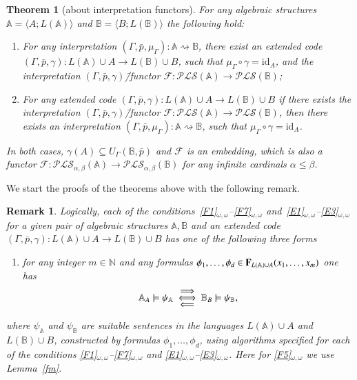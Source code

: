 \documentclass[12pt]{article}
\newtheorem{theorem}{Theorem}
\newtheorem{remark}{Remark}
\theoremstyle{definition}
\def\N{{\mathbb{N}}}
\def\MA{{\mathbb{A}}}
\def\MB{{\mathbb{B}}}
\def\F{{\mathcal{F}}}
\def\PLS{{\mathcal{PLS}}}
\def\id{{\mathrm{id}}}
\begin{document}
\begin{theorem}[about interpretation functors]\label{th:functor2}
For any algebraic structures $\MA=\langle A; L(\MA)\rangle$ and $\MB=\langle B; L(\MB)\rangle$ the following hold:
    \begin{enumerate}[label=(\arabic*)]
        \item\label{item:IF1} For any interpretation $(\Gamma,\bar p, \mu_\Gamma)\colon \MA\rightsquigarrow\MB$, there exist an extended code $(\Gamma,\bar p,\gamma)\colon L(\MA)\cup A\to L(\MB)\cup B$, such that $\mu_\Gamma \circ\gamma=\id_A$, and the interpretation $(\Gamma,\bar p,\gamma)$\=/functor $\F\colon\PLS(\MA)\to \PLS(\MB)$;
            \item\label{item:IF2} For any extended code $(\Gamma,\bar p,\gamma)\colon L(\MA)\cup A\to L(\MB)\cup B$ if there exists the interpretation $(\Gamma,\bar p,\gamma)$\=/functor $\F\colon\PLS(\MA)\to \PLS(\MB)$, then there exists an interpretation $(\Gamma,\bar p, \mu_\Gamma)\colon \MA\rightsquigarrow\MB$, such that $\mu_\Gamma \circ\gamma=\id_A$.
    \end{enumerate}
In both cases, $\gamma(A)\subseteq U_\Gamma(\MB,\bar p)$ and $\F$ is an embedding, which is also a functor $\F\colon\PLS_{\alpha,\beta}(\MA)\to \PLS_{\alpha,\beta}(\MB)$ for any infinite cardinals $\alpha\leqslant\beta$.
\end{theorem}

We start the proofs of the theorems above with the following remark. 

\begin{remark}\label{remark:FE}
Logically, each of the conditions~\ref{F1}$_{\omega,\omega}$--\ref{F7}$_{\omega,\omega}$ and~\ref{E1}$_{\omega,\omega}$--\ref{E3}$_{\omega,\omega}$ for a given pair of algebraic structures $\MA,\MB$ and an extended code $(\Gamma,\bar p,\gamma)\colon L(\MA)\cup A\to L(\MB)\cup B$ has one of the following three forms
\begin{enumerate}[label=(FE)$_{\omega,\omega}$]
\item\label{EF} for any integer $m\in\N$ and any formulas $\phi_1,\ldots,\phi_d\in {\bf F}_{L(\MA)\cup A}(x_1,\ldots,x_m)$ one has 
$$
\MA_A\models \psi_{\MA} \ \underset{\text{\normalsize $\Longleftarrow$}}{\overset{\text{\normalsize $\Longrightarrow$}}{\Longleftrightarrow}} \ \MB_B\models \psi_\MB, 
$$
\end{enumerate}
where $\psi_\MA$ and $\psi_\MB$ are suitable sentences in the languages $L(\MA)\cup A$ and $L(\MB)\cup B$, constructed by formulas $\phi_1,\ldots,\phi_d$, using algorithms specified for each of the conditions \ref{F1}$_{\omega,\omega}$--\ref{F7}$_{\omega,\omega}$ and  \ref{E1}$_{\omega,\omega}$--\ref{E3}$_{\omega,\omega}$. Here for \ref{F5}$_{\omega,\omega}$ we use Lemma~\ref{fm}. 
\end{remark}
\end{document}
